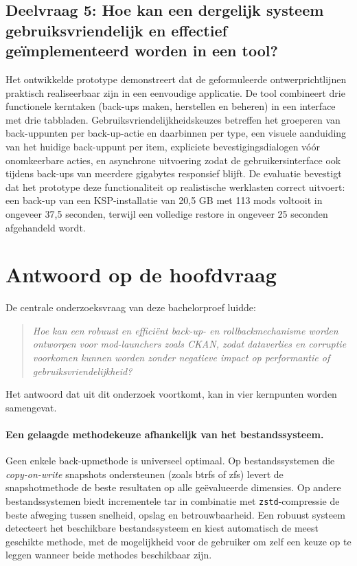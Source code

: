 \subsection*{Deelvraag 5: Hoe kan een dergelijk systeem gebruiksvriendelijk en effectief geïmplementeerd worden in een tool?}

Het ontwikkelde prototype demonstreert dat de geformuleerde ontwerprichtlijnen praktisch realiseerbaar zijn in een eenvoudige applicatie. De tool combineert drie functionele kerntaken (back-ups maken, herstellen en beheren) in een interface met drie tabbladen. Gebruiksvriendelijkheidskeuzes betreffen het groeperen van back-uppunten per back-up-actie en daarbinnen per type, een visuele aanduiding van het huidige back-uppunt per item, expliciete bevestigingsdialogen vóór onomkeerbare acties, en asynchrone uitvoering zodat de gebruikersinterface ook tijdens back-ups van meerdere gigabytes responsief blijft. De evaluatie bevestigt dat het prototype deze functionaliteit op realistische werklasten correct uitvoert: een back-up van een KSP-installatie van 20{,}5 GB met 113 mods voltooit in ongeveer 37{,}5 seconden, terwijl een volledige restore in ongeveer 25 seconden afgehandeld wordt.


\section{Antwoord op de hoofdvraag}
\label{sec:concl-hoofdvraag}

De centrale onderzoeksvraag van deze bachelorproef luidde:

\begin{quote}
    \emph{Hoe kan een robuust en efficiënt back-up- en rollbackmechanisme worden ontworpen voor mod-launchers zoals CKAN, zodat dataverlies en corruptie voorkomen kunnen worden zonder negatieve impact op performantie of gebruiksvriendelijkheid?}
\end{quote}

Het antwoord dat uit dit onderzoek voortkomt, kan in vier kernpunten worden samengevat.

\paragraph{Een gelaagde methodekeuze afhankelijk van het bestandssysteem.}
Geen enkele back-upmethode is universeel optimaal. Op bestandssystemen die \textit{copy-on-write} snapshots ondersteunen (zoals btrfs of zfs) levert de snapshotmethode de beste resultaten op alle geëvalueerde dimensies. Op andere bestandssystemen biedt incrementele tar in combinatie met \texttt{zstd}-compressie de beste afweging tussen snelheid, opslag en betrouwbaarheid. Een robuust systeem detecteert het beschikbare bestandssysteem en kiest automatisch de meest geschikte methode, met de mogelijkheid voor de gebruiker om zelf een keuze op te leggen wanneer beide methodes beschikbaar zijn.

